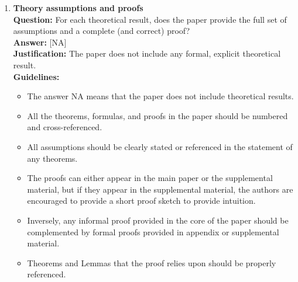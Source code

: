 \begin{enumerate}
\item \textbf{Theory assumptions and proofs}\\
\textbf{Question:} For each theoretical result, does the paper provide the full set of assumptions and a complete (and correct) proof?\\
\textbf{Answer:} [NA]\\
\textbf{Justification:} The paper does not include any formal, explicit theoretical result.\\
\textbf{Guidelines:}
\begin{itemize}
\item The answer NA means that the paper does not include theoretical results.
\item All the theorems, formulas, and proofs in the paper should be numbered and cross-referenced.
\item All assumptions should be clearly stated or referenced in the statement of any theorems.
\item The proofs can either appear in the main paper or the supplemental material, but if they appear in the supplemental material, the authors are encouraged to provide a short proof sketch to provide intuition.
\item Inversely, any informal proof provided in the core of the paper should be complemented by formal proofs provided in appendix or supplemental material.
\item Theorems and Lemmas that the proof relies upon should be properly referenced.
\end{itemize}


\end{enumerate}

